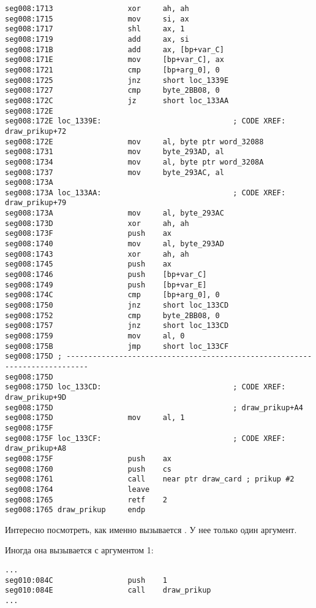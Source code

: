 \begin{lstlisting}[style=customasmx86]
seg008:1713                 xor     ah, ah
seg008:1715                 mov     si, ax
seg008:1717                 shl     ax, 1
seg008:1719                 add     ax, si
seg008:171B                 add     ax, [bp+var_C]
seg008:171E                 mov     [bp+var_C], ax
seg008:1721                 cmp     [bp+arg_0], 0
seg008:1725                 jnz     short loc_1339E
seg008:1727                 cmp     byte_2BB08, 0
seg008:172C                 jz      short loc_133AA
seg008:172E
seg008:172E loc_1339E:                              ; CODE XREF: draw_prikup+72
seg008:172E                 mov     al, byte ptr word_32088
seg008:1731                 mov     byte_293AD, al
seg008:1734                 mov     al, byte ptr word_3208A
seg008:1737                 mov     byte_293AC, al
seg008:173A
seg008:173A loc_133AA:                              ; CODE XREF: draw_prikup+79
seg008:173A                 mov     al, byte_293AC
seg008:173D                 xor     ah, ah
seg008:173F                 push    ax
seg008:1740                 mov     al, byte_293AD
seg008:1743                 xor     ah, ah
seg008:1745                 push    ax
seg008:1746                 push    [bp+var_C]
seg008:1749                 push    [bp+var_E]
seg008:174C                 cmp     [bp+arg_0], 0
seg008:1750                 jnz     short loc_133CD
seg008:1752                 cmp     byte_2BB08, 0
seg008:1757                 jnz     short loc_133CD
seg008:1759                 mov     al, 0
seg008:175B                 jmp     short loc_133CF
seg008:175D ; ---------------------------------------------------------------------------
seg008:175D
seg008:175D loc_133CD:                              ; CODE XREF: draw_prikup+9D
seg008:175D                                         ; draw_prikup+A4
seg008:175D                 mov     al, 1
seg008:175F
seg008:175F loc_133CF:                              ; CODE XREF: draw_prikup+A8
seg008:175F                 push    ax
seg008:1760                 push    cs
seg008:1761                 call    near ptr draw_card ; prikup #2
seg008:1764                 leave
seg008:1765                 retf    2
seg008:1765 draw_prikup     endp
\end{lstlisting}

Интересно посмотреть, как именно вызывается . У нее только один аргумент.

Иногда она вызывается с аргументом 1:

\begin{lstlisting}[style=customasmx86]
...
seg010:084C                 push    1
seg010:084E                 call    draw_prikup
...
\end{lstlisting}

